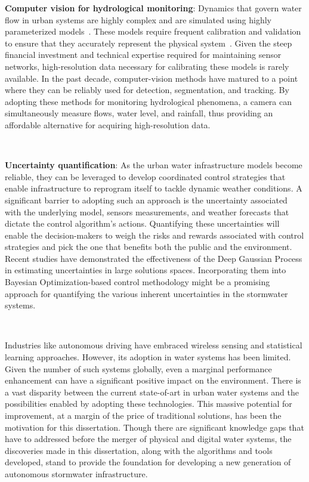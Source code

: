 \textbf{Computer vision for hydrological monitoring}: Dynamics that govern water flow in urban systems are highly complex and are simulated using highly parameterized models~\cite{Rossman2010Storm5.1}.
These models require frequent calibration and validation to ensure that they accurately represent the physical system~\cite{Rossman2010Storm5.1, national2009urban}.
Given the steep financial investment and technical expertise required for maintaining sensor networks, high-resolution data necessary for calibrating these models is rarely available\cite{kerkez2016, Bartos_2018}.
In the past decade, computer-vision methods have matured to a point where they can be reliably used for detection, segmentation, and tracking\cite{LeCun2015DeepLearning}.
By adopting these methods for monitoring hydrological phenomena, a camera can simultaneously measure flows, water level, and rainfall, thus providing an affordable alternative for acquiring high-resolution data.

\

\textbf{Uncertainty quantification}: As the urban water infrastructure models become reliable, they can be leveraged to develop coordinated control strategies that enable infrastructure to reprogram itself to tackle dynamic weather conditions\cite{Mullapudi_Lewis_Gruden_Kerkez_2020}.
A significant barrier to adopting such an approach is the uncertainty associated with the underlying model, sensors measurements, and weather forecasts that dictate the control algorithm's actions.
Quantifying these uncertainties will enable the decision-makers to weigh the risks and rewards associated with control strategies and pick the one that benefits both the public and the environment\cite{sadler2019}.
Recent studies have demonstrated the effectiveness of the Deep Gaussian Process in estimating uncertainties in large solutions spaces\cite{damianou2013deep}.
Incorporating them into Bayesian Optimization-based control methodology might be a promising approach for quantifying the various inherent uncertainties in the stormwater systems.

\

Industries like autonomous driving have embraced wireless sensing and statistical learning approaches.
However, its adoption in water systems has been limited. Given the number of such systems globally, even a marginal performance enhancement can have a significant positive impact on the environment.
There is a vast disparity between the current state-of-art in urban water systems and the possibilities enabled by adopting these technologies.
This massive potential for improvement, at a margin of the price of traditional solutions, has been the motivation for this dissertation.
Though there are significant knowledge gaps that have to addressed before the merger of physical and digital water systems, the discoveries made in this dissertation, along with the algorithms and tools developed, stand to provide the foundation for developing a new generation of autonomous stormwater infrastructure.
